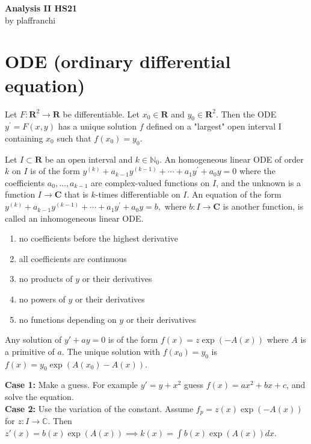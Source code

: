 \documentclass[10pt,landscape, a4paper]{article}
\newcommand{\custombox}[3]{\begin{tcolorbox}[title = \textbf{#1}, colback=#2!10!white, colframe = #2!70!white, coltitle=white]
    #3
    \end{tcolorbox}}
\newcommand{\theorem}[2]{\custombox{Theorem #1}{red}{#2}}
\newcommand{\definition}[2]{\custombox{Definition #1}{orange}{#2}}
\newcommand{\prop}[2]{\custombox{Proposition #1}{black!50!orange!30!yellow}{#2}}
\newcommand{\other}[2]{\custombox{#1}{green!60!black}{#2}}
\begin{document}
\begin{multicols*}{3}
    \begin{center}
        \Large{\textbf{Analysis II HS21}} \\
        \small{by plaffranchi}
    \end{center}
    \section{ODE (ordinary differential equation)}
    \theorem{2.1.6}{Let $F: \mathbf{R}^{2} \rightarrow \mathbf{R}$ be differentiable. Let $x_{0} \in \mathbf{R}$ and $y_{0} \in \mathbf{R}^{2}$. Then the ODE
    $ y^{\prime}=F(x, y) $ has a unique solution $f$ defined on a "largest" open interval I containing $x_{0}$ such that $f\left(x_{0}\right)=y_{0} .$}
    \definition{2.2.1}{Let $I \subset \mathbf{R}$ be an open interval and $k \in \mathbb{N}_0$. An homogeneous linear ODE of order $k$ on $I$ is of the form
    $
        y^{(k)}+a_{k-1} y^{(k-1)}+\cdots+a_{1} y^{\prime}+a_{0} y=0
    $
    where the coefficients $a_{0}, \ldots, a_{k-1}$ are complex-valued functions on $I$, and the unknown is a function $I \to \mathbf{C}$ that is $k$-times differentiable on $I$.
    An equation of the form
    $
        y^{(k)}+a_{k-1} y^{(k-1)}+\cdots+a_{1} y^{\prime}+a_{0} y=b,
    $
    where $b: I \rightarrow \mathbf{C}$ is another function, is called an inhomogeneous linear ODE.}
    \other{Recognize an ODE}{\begin{enumerate}
        \item no coefficients before the highest derivative
        \item all coefficients are continuous
        \item no products of $y$ or their derivatives
        \item no powers of $y$ or their derivatives
        \item no functions depending on $y$ or their derivatives
    \end{enumerate}}



    \prop{2.3.1}{Any solution of $y'+ay=0$ is of the form $f(x)=z\exp(-A(x))$ where $A$ is a primitive of $a$. The unique solution with $f(x_0)=y_0$ is $f(x)= y_0\exp(A(x_0)-A(x))$.}

    \other{Solving inhomogeneous equations}{\textbf{Case 1:} Make a guess. For example $y'=y+x^2$ guess $f(x) = ax^2+bx+c$, and solve the equation.\\
    \textbf{Case 2:} Use the variation of the constant. Assume $f_p=z(x)\exp(-A(x))$ for $z: I\to \mathbb{C}$. Then $z'(x) = b(x)\exp(A(x)) \implies k(x) = \int b(x)\exp(A(x))dx$.}


\end{multicols*}
\end{document}
